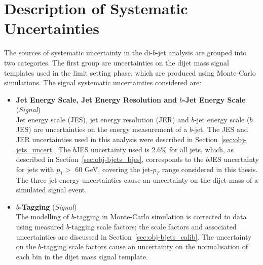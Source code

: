 \vspace{-0.5em}
\section{Description of Systematic Uncertainties}
\label{sec:lim-syst}
\vspace{-0.5em}

The sources of systematic uncertainty in the di-$b$-jet analysis are grouped into two categories.
The first group are uncertainties on the dijet mass signal templates used in the limit setting phase, which are produced using Monte-Carlo simulations.
The signal systematic uncertainties considered are:
\vspace{-0.2em}
\begin{itemize}[leftmargin=*]
\item\textbf{Jet Energy Scale, Jet Energy Resolution  and $b$-Jet Energy Scale} \hspace{1mm} (\textit{Signal})\\
  Jet energy scale (JES), jet energy resolution (JER) and  $b$-jet energy scale ($b$JES) are uncertainties
  on the energy measurement of a $b$-jet.
  The JES and JER uncertainties used in this analysis were described in Section~\ref{sec:obj-jets_uncert}.
  The $b$JES uncertainty used is 2.6\% for all jets, which, 
  as described in Section~\ref{sec:obj-bjets_bjes}, corresponds to the $b$JES uncertainty for jets with $p_T >$ 60 GeV,
  covering the jet-$p_T$ range considered in this thesis.
  The three jet energy uncertainties cause an uncertainty on the dijet mass of a simulated signal event.\vspace{0.7em}

\item\textbf{$b$-Tagging} \hspace{1mm} (\textit{Signal})\\
  The modelling of $b$-tagging in Monte-Carlo simulation is corrected to data using measured $b$-tagging scale factors;
  the scale factors and associated uncertainties are discussed in Section~\ref{sec:obj-bjets_calib}.
  The uncertainty on the $b$-tagging scale factors cause an uncertainty on the normalisation of each bin in the dijet mass signal template.
  \vspace{0.3em}


\end{itemize}

